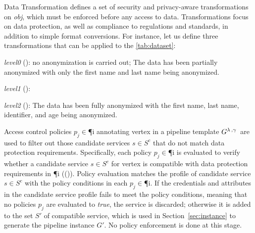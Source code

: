 \begin{definition}[Policy]
\begin{description}
          \item Data Transformation \textit{\TP} defines a set of security and privacy-aware transformations on \textit{obj}, which must be enforced before any access to data.
                Transformations focus on data protection, as well as compliance to regulations and standards, in addition to simple format conversions.
                For instance, let us define three transformations that can be applied to the \cref{tab:dataset}:     \begin{enumerate*}[label=\roman*)]
                  \item \emph{level0} (): no anonymization is carried out;
                        The data has been partially anonymized with only the first name and last name being anonymized.
                  \item \emph{level1} (): \item \emph{level2} (): The data has been fully anonymized with the first name, last name, identifier, and age being anonymized.
                \end{enumerate*}
        \end{description}
      \end{definition}

      Access control policies $p_j$$\in$\P{i} annotating vertex  in a pipeline template $G^{\lambda\,,\gamma\,}$ are used to filter out those candidate services $s$$\in$$S^c$ that do not match data protection requirements. Specifically, each policy $p_j$$\in$\P{i} is evaluated to verify whether a candidate service $s$$\in$$S^c$ for vertex  is compatible with data protection requirements in \P{i} (\myLambda()). Policy evaluation matches the profile of candidate service $s$$\in$$S^c$ with the policy conditions in each $p_j$$\in$\P{i}. If the credentials and attributes in the candidate service profile fails to meet the policy conditions, meaning that no policies $p_j$ are evaluated to \emph{true}, the service is discarded; otherwise it is added to the set $S'$ of compatible service, which is used in Section~\ref{sec:instance} to generate the pipeline instance $G'$. No policy enforcement is done at this stage.

